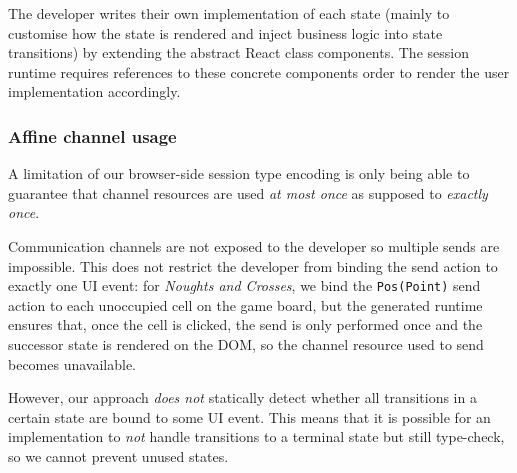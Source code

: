 The developer writes their own implementation of each state (mainly to
customise how the state is rendered and inject business logic into state
transitions) by extending the abstract React class components.
The session runtime requires references to these concrete components order to
render the user implementation accordingly.

\subsubsection{Affine channel usage}
A limitation of our browser-side session type encoding is only being able to
guarantee that channel resources are used \textit{at most once} as supposed to
\textit{exactly once}.

Communication channels are not exposed to the developer so multiple sends are
impossible.
This does not restrict the developer from binding the send action to exactly
one UI event: for \textit{Noughts and Crosses}, we bind the \texttt{Pos(Point)}
send action to each unoccupied cell on the game board, but the generated
runtime ensures that, once the cell is clicked, the send is only performed once
and the successor state is rendered on the DOM, so the channel resource used to
send becomes unavailable.

However, our approach \textit{does not} statically detect whether all
transitions in a certain state are bound to some UI event.
This means that it is possible for an implementation to \textit{not} handle
transitions to a terminal state but still type-check, so we cannot prevent
unused states.

